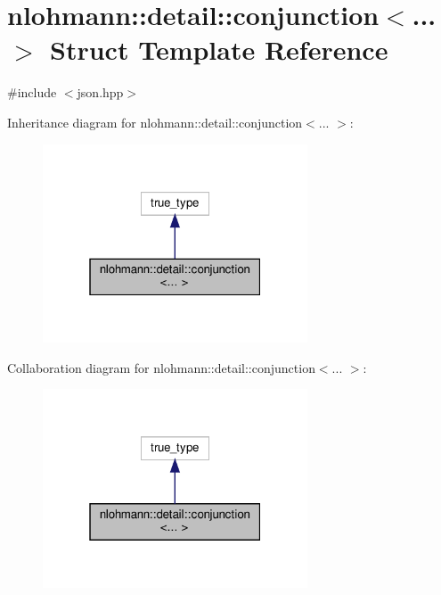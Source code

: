 \hypertarget{structnlohmann_1_1detail_1_1conjunction}{}\section{nlohmann\+:\+:detail\+:\+:conjunction$<$... $>$ Struct Template Reference}
\label{structnlohmann_1_1detail_1_1conjunction}


{\ttfamily \#include $<$json.\+hpp$>$}



Inheritance diagram for nlohmann\+:\+:detail\+:\+:conjunction$<$... $>$\+:
\nopagebreak
\begin{figure}[H]
\begin{center}
\leavevmode
\includegraphics[width=223pt]{structnlohmann_1_1detail_1_1conjunction__inherit__graph}
\end{center}
\end{figure}


Collaboration diagram for nlohmann\+:\+:detail\+:\+:conjunction$<$... $>$\+:
\nopagebreak
\begin{figure}[H]
\begin{center}
\leavevmode
\includegraphics[width=223pt]{structnlohmann_1_1detail_1_1conjunction__coll__graph}
\end{center}
\end{figure}


